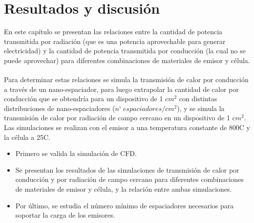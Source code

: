 \chapter{Resultados y discusión}
En este capítulo se presentan las relaciones entre la cantidad de potencia transmitida por radiación (que es una potencia aprovechable para generar electricidad) y la cantidad de potencia transmitida por conducción (la cual no se puede aprovechar) para diferentes combinaciones de materiales de emisor y célula.\\\\
Para determinar estas relaciones se simula la transmisión de calor por conducción a través de un nano-espaciador, para luego extrapolar la cantidad de calor por conducción que se obtendría para un dispositivo de 1 $cm^2$ con distintas distribuciones de nano-espaciadores ($n^{\underline{\circ}}\ espaciadores/cm^2$), y se simula la transmisión de calor por radiación de campo cercano en un dispositivo de 1 $cm^2$. Las simulaciones se realizan con el emisor a una temperatura constante de 800\textdegree C y la célula a 25\textdegree C.
\begin{itemize}
	\item Primero se valida la simulación de CFD.
	\item Se presentan los resultados de las simulaciones de transmisión de calor por conducción y por radiación de campo cercano para diferentes combinaciones de materiales de emisor y célula, y la relación entre ambas simulaciones.
	\item Por último, se estudia el número mínimo de espaciadores necesarios para soportar la carga de los emisores.
\end{itemize}
